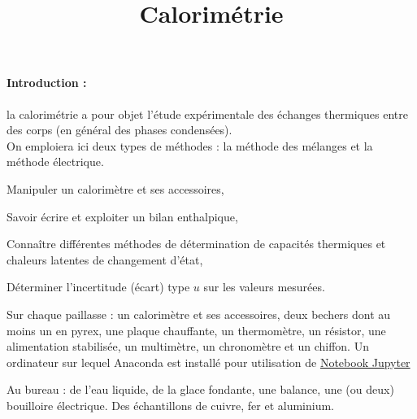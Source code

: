 

\def\nompdf{Calorimetrie}







\title{Calorimétrie}



\paragraph{Introduction :} la calorimétrie a pour objet l'étude expérimentale des échanges thermiques entre des corps (en général des phases condensées).\\
On emploiera ici deux types de méthodes : la méthode des mélanges et la méthode électrique.

\objectifs
\begin{list}{\textbullet}{}
\item Manipuler un calorimètre et ses accessoires,
\item Savoir écrire et exploiter un bilan enthalpique,
\item Connaître différentes méthodes de détermination de capacités thermiques et chaleurs latentes de changement d'état,
\item Déterminer l'incertitude (écart) type $u$ sur les valeurs mesurées.
\end{list}

\materiel
\begin{list}{\textbullet}{}
\item Sur chaque paillasse : un calorimètre et ses accessoires, deux bechers dont au moins un en pyrex, une plaque chauffante, un thermomètre, un résistor, une alimentation stabilisée, un multimètre, un chronomètre et un chiffon. Un ordinateur sur lequel Anaconda est installé pour utilisation de \href{https://colab.research.google.com/drive/1PetqwzUOcJiuxUtyVSsJfLvtuIA2niTm#scrollTo=tA9XPTL0j2ae}{Notebook Jupyter}
\item Au bureau : de l'eau liquide, de la glace fondante, une balance, une (ou deux) bouilloire électrique. Des échantillons de cuivre, fer et aluminium.
\end{list}


